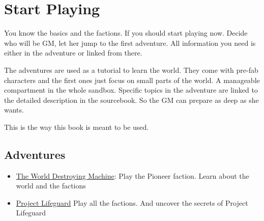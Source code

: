 \chapter{Start Playing}

You know the basics and the factions. If you should start playing now. Decide who will be GM, let her jump to the first adventure.
All information you need is either in the adventure or linked from there.

The adventures are used as a tutorial to learn the world. They come with pre-fab characters and the first ones just focus on small parts of the world. A manageable compartment in the whole sandbox.
Specific topics in the adventure are linked to the detailed description in the sourcebook. So the GM can prepare as deep as she wants.

This is the way this book is meant to be used.

\section{Adventures}

\begin{itemize}
\item \hyperref[ch:the world destroying machine]{The World Destroying Machine}: Play the Pioneer faction. Learn about the world and the factions
\item \hyperref[ch:project lifeguard]{Project Lifeguard} Play all the factions. And uncover the secrets of Project Lifeguard
\end{itemize}